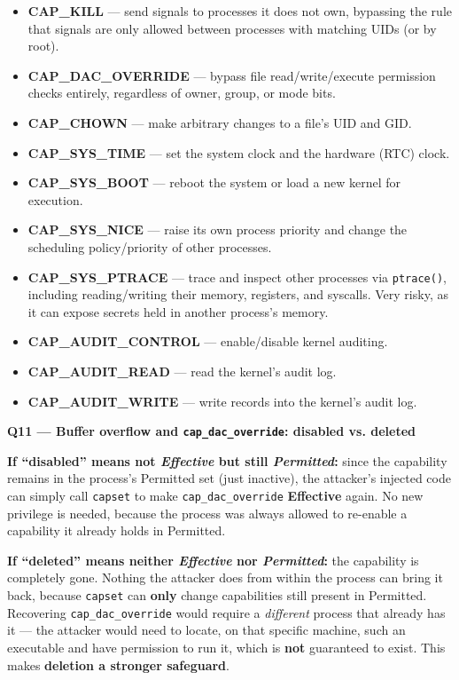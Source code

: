 \documentclass[11pt,a4paper]{article}
\newcommand{\question}[1]{\par\medskip\noindent\textbf{#1}\par\smallskip}
\begin{document}
\begin{itemize}[nosep]
    \item \textbf{CAP\_KILL} --- send signals to processes it does not own, bypassing the rule that signals are only allowed between processes with matching UIDs (or by root).
    \item \textbf{CAP\_DAC\_OVERRIDE} --- bypass file read/write/execute permission checks entirely, regardless of owner, group, or mode bits.
    \item \textbf{CAP\_CHOWN} --- make arbitrary changes to a file's UID and GID.
    \item \textbf{CAP\_SYS\_TIME} --- set the system clock and the hardware (RTC) clock.
    \item \textbf{CAP\_SYS\_BOOT} --- reboot the system or load a new kernel for execution.
    \item \textbf{CAP\_SYS\_NICE} --- raise its own process priority and change the scheduling policy/priority of other processes.
    \item \textbf{CAP\_SYS\_PTRACE} --- trace and inspect other processes via \texttt{ptrace()}, including reading/writing their memory, registers, and syscalls. Very risky, as it can expose secrets held in another process's memory.
    \item \textbf{CAP\_AUDIT\_CONTROL} --- enable/disable kernel auditing.
    \item \textbf{CAP\_AUDIT\_READ} --- read the kernel's audit log.
    \item \textbf{CAP\_AUDIT\_WRITE} --- write records into the kernel's audit log.
\end{itemize}

\question{Q11 --- Buffer overflow and \texttt{cap\_dac\_override}: disabled vs. deleted}
\textbf{If ``disabled'' means not \emph{Effective} but still \emph{Permitted}:} since the capability remains in the process's Permitted set (just inactive), the attacker's injected code can simply call \texttt{capset} to make \texttt{cap\_dac\_override} \textbf{Effective} again. No new privilege is needed, because the process was always allowed to re-enable a capability it already holds in Permitted.

\textbf{If ``deleted'' means neither \emph{Effective} nor \emph{Permitted}:} the capability is completely gone. Nothing the attacker does from within the process can bring it back, because \texttt{capset} can \textbf{only} change capabilities still present in Permitted. Recovering \texttt{cap\_dac\_override} would require a \emph{different} process that already has it --- the attacker would need to locate, on that specific machine, such an executable and have permission to run it, which is \textbf{not} guaranteed to exist. This makes \textbf{deletion a stronger safeguard}.
\end{document}
